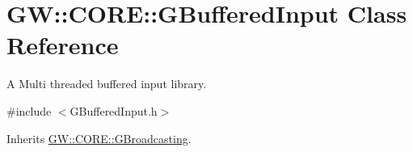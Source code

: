 \hypertarget{class_g_w_1_1_c_o_r_e_1_1_g_buffered_input}{}\section{GW\+:\+:C\+O\+RE\+:\+:G\+Buffered\+Input Class Reference}
\label{class_g_w_1_1_c_o_r_e_1_1_g_buffered_input}


A Multi threaded buffered input library.  




{\ttfamily \#include $<$G\+Buffered\+Input.\+h$>$}



Inherits \hyperlink{class_g_w_1_1_c_o_r_e_1_1_g_broadcasting}{G\+W\+::\+C\+O\+R\+E\+::\+G\+Broadcasting}.


